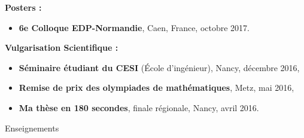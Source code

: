 \documentclass[10pt,a4paper]{report}
\begin{document}
\vspace{0.3cm}
\noindent
{\selectfont
\textbf{Posters :}
}

\begin{itemize}
\item \textbf{6e Colloque EDP-Normandie}, Caen, France, octobre 2017.
\end{itemize}

\vspace{0.3cm}
\noindent
{\selectfont
\textbf{Vulgarisation Scientifique :}
}
\begin{itemize}
\item \textbf{Séminaire étudiant du CESI }(\'Ecole d'ingénieur), Nancy, décembre 2016,
\item \textbf{Remise de prix des olympiades de mathématiques}, Metz, mai 2016,
\item \textbf{Ma thèse en 180 secondes}, finale régionale, Nancy, avril 2016.
\end{itemize}

\vspace{.5cm}
\noindent
{\selectfont
\begin{Large}
Enseignements
\end{Large}
\hrulefill
}
\end{document}
